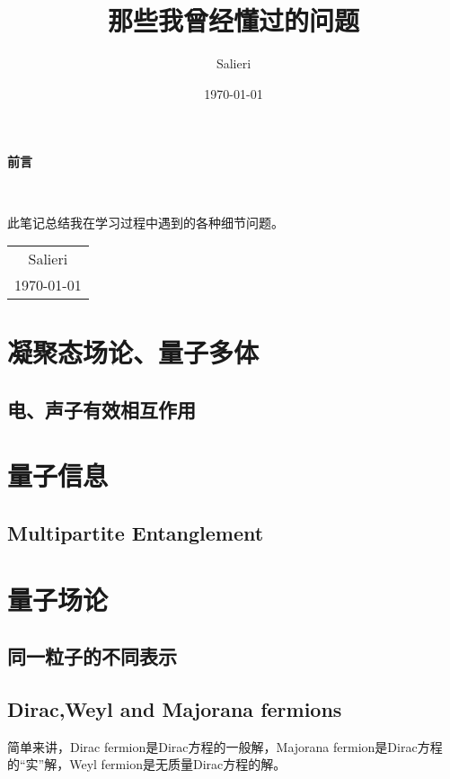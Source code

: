 \documentclass[12pt, a4paper, oneside]{ctexbook}
\title{{\Huge{\textbf{那些我曾经懂过的问题}}}\\}
\author{Salieri}
\date{\today}
\begin{document}
	\maketitle
	
	\setcounter{page}{1}
	
	\begin{center}
		\Huge\textbf{前言}
	\end{center}~\
	
	此笔记总结我在学习过程中遇到的各种细节问题。
	~\\
	\begin{flushright}
		\begin{tabular}{c}
			Salieri\\
			\today
		\end{tabular}
	\end{flushright}
	
	\newpage
	\setcounter{page}{1}
	\tableofcontents
	\newpage
	\setcounter{page}{1}
	\chapter{凝聚态场论、量子多体}
    \section{电、声子有效相互作用}
    \chapter{量子信息}
    \section{Multipartite Entanglement}
	\chapter{量子场论}
    \section{同一粒子的不同表示}
	\section{Dirac,Weyl and Majorana fermions}\cite{pal2011dirac}
	简单来讲，Dirac fermion是Dirac方程的一般解，Majorana fermion是Dirac方程的“实”解，Weyl fermion是无质量Dirac方程的解。\\
\end{document}
